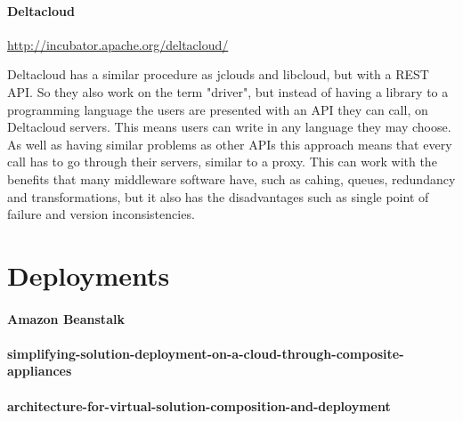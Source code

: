 \paragraph{Deltacloud}
\url{http://incubator.apache.org/deltacloud/}

Deltacloud has a similar procedure as jclouds and libcloud, but with a REST API. 
So they also work on the term "driver", but instead of having a library to a programming language the users are presented with an API they can call, 
on Deltacloud servers. This means users can write in any language they may choose. 
As well as having similar problems as other APIs this approach means that every call has to go through their servers, 
similar to a proxy. This can work with the benefits that many middleware software have, such as cahing, queues, 
redundancy and transformations, but it also has the disadvantages such as single point of failure and version inconsistencies.

\section{Deployments}

\paragraph{Amazon Beanstalk}
\paragraph{simplifying-solution-deployment-on-a-cloud-through-composite-appliances}
\paragraph{architecture-for-virtual-solution-composition-and-deployment}


